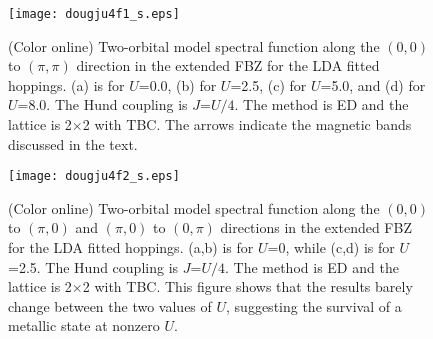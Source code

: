 \documentclass[aps,prb,superscriptaddress,preprintnumbers,
showpacs,legalpaper,twoside,twocolumn,amsmath,amssymb]{revtex4}
\begin{document}
\begin{figure}[thbp]
\begin{center}
\texttt{[image: dougju4f1\_s.eps]}
\vskip -0.3cm
\caption{(Color online) Two-orbital model
spectral function along the $(0,0)$ to $(\pi,\pi)$ direction
in the extended FBZ for the LDA fitted
hoppings.\cite{scalapino}
(a) is for $U$=0.0, (b) for $U$=2.5, (c) for $U$=5.0, and (d) for $U$=8.0.
The Hund coupling is $J$=$U/4$. The method is ED and
the lattice is 2$\times$2 with TBC.
The arrows indicate the magnetic bands discussed in the text.}
\vskip -0.5cm
\label{doug_akju4}
\end{center}
\end{figure}

\begin{figure}[thbp]
\begin{center}
\vskip 0.5cm
\texttt{[image: dougju4f2\_s.eps]}
\vskip -0.3cm
\caption{(Color online) Two-orbital model
spectral function along the $(0,0)$ to $(\pi,0)$ and $(\pi,0)$ to $(0,\pi)$
directions
in the extended FBZ for the LDA fitted
hoppings.\cite{scalapino}
(a,b) is for $U$=0, while (c,d) is for $U$=2.5.
The Hund coupling is $J$=$U/4$. The method is ED and
the lattice is 2$\times$2 with TBC. This figure shows that the results barely change between the two
values of $U$, suggesting the survival of a metallic state at nonzero $U$.}
\vskip -0.9cm
\label{doug_akju4_other}
\end{center}
\end{figure}
\end{document}
